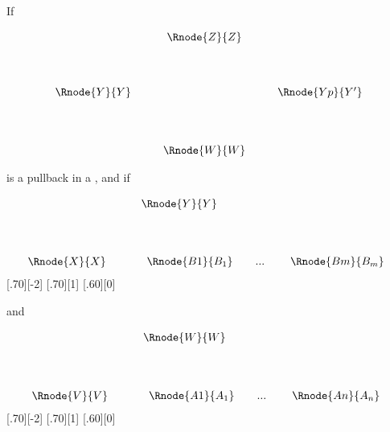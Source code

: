 \documentclass[10pt,a4paper]{scrartcl}
\begin{document}
\begin{lemma}
If 
\begin{center}
\begin{equation}
\label{ddtwopb}
\begin{array}{cp{0.3cm}c    p{0.3cm}  c }
               & & \Rnode{Z}{Z} & &                                  \\ [1.3cm]
\Rnode{Y}{Y}   &&                               & & \Rnode{Yp}{Y'}   \\ [1.4cm]
               & & \Rnode{W}{W} & &   
\end{array}
\end{equation}
\end{center}

\noindent
is a pullback in a \ccatc,
and if 
\begin{center}
\begin{equation}
\label{ddtwoYlimit}
\begin{array}{c p{0.4cm} l  }
 && \Rnode{Y}{Y}  \\ [1.4cm]
\Rnode{X}{X} &&
\begin{array}{cp{0cm}c   p{0.1cm}     c  }					
                             \Rnode{B1}{B_1}&   & ... & & \Rnode{Bm}{B_{m}}
	                      \end{array}           
\end{array} 
\end{equation}
[.70][-2]
[.70][1]
[.60][0]
\end{center}

\noindent
and
\begin{center}
\begin{equation}
\label{ddtwoWlimit}
\begin{array}{c p{0.4cm} l  }
 && \Rnode{W}{W}  \\ [1.4cm]
\Rnode{V}{V} &&
\begin{array}{cp{0cm}c   p{0.1cm}     c  }					
                             \Rnode{A1}{A_1}&   & ... & & \Rnode{An}{A_n}
	                      \end{array}         
\end{array} 
\end{equation}
[.70][-2]
[.70][1]
[.60][0]
\end{center}


\end{lemma}
\end{document}
